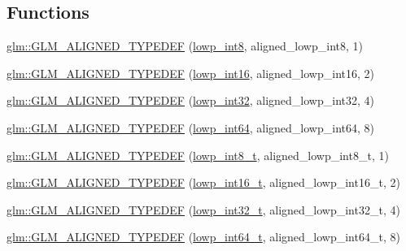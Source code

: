 \subsection*{Functions}
\begin{DoxyCompactItemize}
\item 
\hyperlink{group__gtx__type__aligned_gab5cd5c5fad228b25c782084f1cc30114}{glm\+::\+G\+L\+M\+\_\+\+A\+L\+I\+G\+N\+E\+D\+\_\+\+T\+Y\+P\+E\+D\+EF} (\hyperlink{group__gtc__type__precision_gaf9e675b6392764242ae87eb179e9d3d6}{lowp\+\_\+int8}, aligned\+\_\+lowp\+\_\+int8, 1)
\item 
\hyperlink{group__gtx__type__aligned_ga5bb5dd895ef625c1b113f2cf400186b0}{glm\+::\+G\+L\+M\+\_\+\+A\+L\+I\+G\+N\+E\+D\+\_\+\+T\+Y\+P\+E\+D\+EF} (\hyperlink{group__gtc__type__precision_ga71fc0c399fa4780507748b643733f153}{lowp\+\_\+int16}, aligned\+\_\+lowp\+\_\+int16, 2)
\item 
\hyperlink{group__gtx__type__aligned_gac6efa54cf7c6c86f7158922abdb1a430}{glm\+::\+G\+L\+M\+\_\+\+A\+L\+I\+G\+N\+E\+D\+\_\+\+T\+Y\+P\+E\+D\+EF} (\hyperlink{group__gtc__type__precision_gad9939c9d6fec1c6accc02a83c6500f08}{lowp\+\_\+int32}, aligned\+\_\+lowp\+\_\+int32, 4)
\item 
\hyperlink{group__gtx__type__aligned_ga6612eb77c8607048e7552279a11eeb5f}{glm\+::\+G\+L\+M\+\_\+\+A\+L\+I\+G\+N\+E\+D\+\_\+\+T\+Y\+P\+E\+D\+EF} (\hyperlink{group__gtc__type__precision_gab8a8e75af347592406e41b3ae2c0712b}{lowp\+\_\+int64}, aligned\+\_\+lowp\+\_\+int64, 8)
\item 
\hyperlink{group__gtx__type__aligned_ga7ddc1848ff2223026db8968ce0c97497}{glm\+::\+G\+L\+M\+\_\+\+A\+L\+I\+G\+N\+E\+D\+\_\+\+T\+Y\+P\+E\+D\+EF} (\hyperlink{group__gtc__type__precision_gae6092311f6970a305c2df19a372360a3}{lowp\+\_\+int8\+\_\+t}, aligned\+\_\+lowp\+\_\+int8\+\_\+t, 1)
\item 
\hyperlink{group__gtx__type__aligned_ga22240dd9458b0f8c11fbcc4f48714f68}{glm\+::\+G\+L\+M\+\_\+\+A\+L\+I\+G\+N\+E\+D\+\_\+\+T\+Y\+P\+E\+D\+EF} (\hyperlink{group__gtc__type__precision_gae34c3d53c4c1434fc9f26538b0185667}{lowp\+\_\+int16\+\_\+t}, aligned\+\_\+lowp\+\_\+int16\+\_\+t, 2)
\item 
\hyperlink{group__gtx__type__aligned_ga8130ea381d76a2cc34a93ccbb6cf487d}{glm\+::\+G\+L\+M\+\_\+\+A\+L\+I\+G\+N\+E\+D\+\_\+\+T\+Y\+P\+E\+D\+EF} (\hyperlink{group__gtc__type__precision_gad9567c806dc39f534174eef42663119d}{lowp\+\_\+int32\+\_\+t}, aligned\+\_\+lowp\+\_\+int32\+\_\+t, 4)
\item 
\hyperlink{group__gtx__type__aligned_ga7ccb60f3215d293fd62b33b31ed0e7be}{glm\+::\+G\+L\+M\+\_\+\+A\+L\+I\+G\+N\+E\+D\+\_\+\+T\+Y\+P\+E\+D\+EF} (\hyperlink{group__gtc__type__precision_ga14d72e76d57c7f28eca8e933816c9fd6}{lowp\+\_\+int64\+\_\+t}, aligned\+\_\+lowp\+\_\+int64\+\_\+t, 8)

\end{DoxyCompactItemize}
